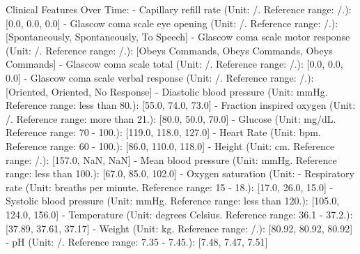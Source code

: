 \begin{tcolorbox}[colback=cadmiumgreen!5!white,colframe=forestgreen!75!white,breakable,title=\textit{Optimized setting prompt template of optimized with in-context for the mortality prediction task on the MIMIC-IV.}]
\begin{VerbatimWrap}
Clinical Features Over Time:
- Capillary refill rate (Unit: /. Reference range: /.): [0.0, 0.0, 0.0]
- Glascow coma scale eye opening (Unit: /. Reference range: /.): [Spontaneously, Spontaneously, To Speech]
- Glascow coma scale motor response (Unit: /. Reference range: /.): [Obeys Commands, Obeys Commands, Obeys Commands]
- Glascow coma scale total (Unit: /. Reference range: /.): [0.0, 0.0, 0.0]
- Glascow coma scale verbal response (Unit: /. Reference range: /.): [Oriented, Oriented, No Response]
- Diastolic blood pressure (Unit: mmHg. Reference range: less than 80.): [55.0, 74.0, 73.0]
- Fraction inspired oxygen (Unit: /. Reference range: more than 21.): [80.0, 50.0, 70.0]
- Glucose (Unit: mg/dL. Reference range: 70 - 100.): [119.0, 118.0, 127.0]
- Heart Rate (Unit: bpm. Reference range: 60 - 100.): [86.0, 110.0, 118.0]
- Height (Unit: cm. Reference range: /.): [157.0, NaN, NaN]
- Mean blood pressure (Unit: mmHg. Reference range: less than 100.): [67.0, 85.0, 102.0]
- Oxygen saturation (Unit: %
- Respiratory rate (Unit: breaths per minute. Reference range: 15 - 18.): [17.0, 26.0, 15.0]
- Systolic blood pressure (Unit: mmHg. Reference range: less than 120.): [105.0, 124.0, 156.0]
- Temperature (Unit: degrees Celsius. Reference range: 36.1 - 37.2.): [37.89, 37.61, 37.17]
- Weight (Unit: kg. Reference range: /.): [80.92, 80.92, 80.92]
- pH (Unit: /. Reference range: 7.35 - 7.45.): [7.48, 7.47, 7.51]
\end{VerbatimWrap}
\end{tcolorbox}




